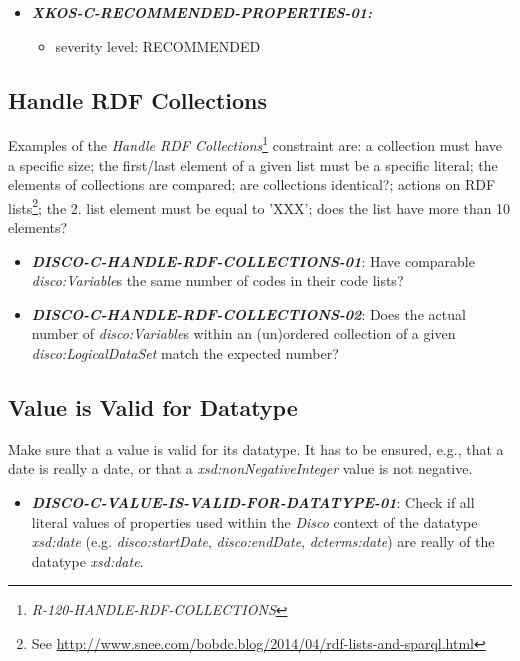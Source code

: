 \documentclass{llncs}
\begin{document}
\begin{itemize}
	\item \textbf{{\em XKOS-C-RECOMMENDED-PROPERTIES-01:}}
	\begin{itemize}
		\item severity level: RECOMMENDED
	\end{itemize}
\end{itemize}

\subsection{Handle RDF Collections}

Examples of the \emph{Handle RDF Collections}\footnote{\emph{R-120-HANDLE-RDF-COLLECTIONS}} constraint are: a collection must have a specific size; the first/last element of a given list must be a specific literal; the elements of collections are compared; are collections identical?; actions on RDF lists\footnote{See \url{http://www.snee.com/bobdc.blog/2014/04/rdf-lists-and-sparql.html}}; the 2. list element must be equal to 'XXX'; does the list have more than 10 elements?

\begin{itemize}
	\item \textbf{{\em DISCO-C-HANDLE-RDF-COLLECTIONS-01}}: Have comparable \emph{disco:Variable}s the same number of codes in their code lists?
	\item \textbf{{\em DISCO-C-HANDLE-RDF-COLLECTIONS-02}}: Does the actual number of \emph{disco:Variable}s within an (un)ordered collection of a given \emph{disco:LogicalDataSet} match the expected number? 
\end{itemize}

\subsection{Value is Valid for Datatype}

Make sure that a value is valid for its datatype.
It has to be ensured, e.g., that a date is really a date, or that a \emph{xsd:nonNegativeInteger} value is not negative. 

\begin{itemize}
	\item \textbf{{\em DISCO-C-VALUE-IS-VALID-FOR-DATATYPE-01}}: Check if all literal values of properties used within the \emph{Disco} context of the datatype {\em xsd:date} (e.g. {\em disco:startDate}, {\em disco:endDate}, {\em dcterms:date}) are really of the datatype {\em xsd:date}.
\end{itemize}
\end{document}
